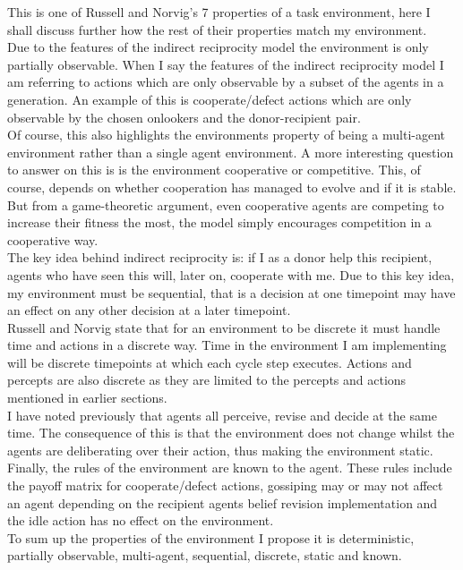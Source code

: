 \documentclass[twoside,twocolumn]{article}
\begin{document}
This is one of Russell and Norvig's 7 properties of a task environment, here I shall discuss further how the rest of their properties match my environment.\\
Due to the features of the indirect reciprocity model the environment is only partially observable. When I say the features of the indirect reciprocity model I am referring to actions which are only observable by a subset of the agents in a generation. An example of this is cooperate/defect actions which are only observable by the chosen onlookers and the donor-recipient pair.\\
Of course, this also highlights the environments property of being a multi-agent environment rather than a single agent environment. A more interesting question to answer on this is is the environment cooperative or competitive. This, of course, depends on whether cooperation has managed to evolve and if it is stable. But from a game-theoretic argument, even cooperative agents are competing to increase their fitness the most, the model simply encourages competition in a cooperative way.\\
The key idea behind indirect reciprocity is: if I as a donor help this recipient, agents who have seen this will, later on, cooperate with me. Due to this key idea, my environment must be sequential, that is a decision at one timepoint may have an effect on any other decision at a later timepoint.\\
Russell and Norvig state that for an environment to be discrete it must handle time and actions in a discrete way. Time in the environment I am implementing will be discrete timepoints at which each cycle step executes. Actions and percepts are also discrete as they are limited to the percepts and actions mentioned in earlier sections.\\
I have noted previously that agents all perceive, revise and decide at the same time. The consequence of this is that the environment does not change whilst the agents are deliberating over their action, thus making the environment static.\\
Finally, the rules of the environment are known to the agent. These rules include the payoff matrix for cooperate/defect actions, gossiping may or may not affect an agent depending on the recipient agents belief revision implementation and the idle action has no effect on the environment.\\
To sum up the properties of the environment I propose it is deterministic, partially observable, multi-agent, sequential, discrete, static and known. 
\end{document}
